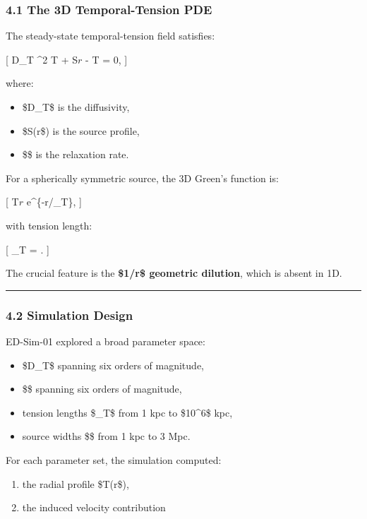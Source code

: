 \subsubsection{4.1 The 3D Temporal-Tension
PDE}\label{the-3d-temporal-tension-pde}

The steady-state temporal-tension field satisfies:

{[} D\_T \nabla\^{}2 T + S\(r\) - \chi T = 0,  {]}

where:

\begin{itemize}
\tightlist
\item
  \$D\_T\$ is the diffusivity,
\item
  \$S(r\$) is the source profile,
\item
  \$\chi\$ is the relaxation rate.
\end{itemize}

For a spherically symmetric source, the 3D Green's function is:

{[} T\(r\) \propto {} e\^{}\{-r/\ell\_T\},  {]}

with tension length:

{[} \ell\_T = .  {]}

The crucial feature is the \textbf{\$1/r\$ geometric dilution}, which is
absent in 1D.

\begin{center}\rule{0.5\linewidth}{0.5pt}\end{center}

\subsubsection{4.2 Simulation Design}\label{simulation-design}

ED-Sim-01 explored a broad parameter space:

\begin{itemize}
\tightlist
\item
  \$D\_T\$ spanning six orders of magnitude,
\item
  \$\chi\$ spanning six orders of magnitude,
\item
  tension lengths \$\ell\_T\$ from 1 kpc to \$10\^{}6\$ kpc,
\item
  source widths \$\sigma\$ from 1 kpc to 3 Mpc.
\end{itemize}

For each parameter set, the simulation computed:

\begin{enumerate}
\def\labelenumi{\arabic{enumi}.}
\tightlist
\item
  the radial profile \$T(r\$),
\item
  the induced velocity contribution
\end{enumerate}

